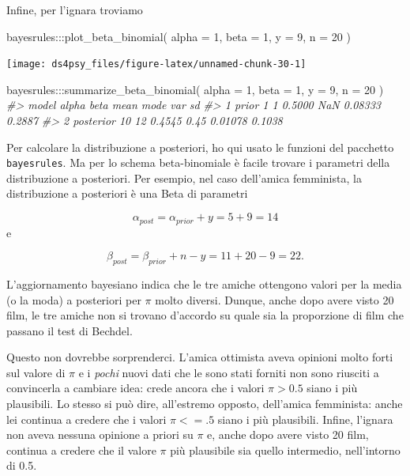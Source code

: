 \documentclass[
  11pt,
]{krantz}
\makeatletter
\newenvironment{Shaded}{\begin{snugshade}}{\end{snugshade}}
\newcommand{\AttributeTok}[1]{\textcolor[rgb]{0.61,0.61,0.61}{#1}}
\newcommand{\CommentTok}[1]{\textcolor[rgb]{0.37,0.37,0.37}{\textit{#1}}}
\newcommand{\DecValTok}[1]{\textcolor[rgb]{0.06,0.06,0.06}{#1}}
\newcommand{\FunctionTok}[1]{\textcolor[rgb]{0,0,0}{#1}}
\newcommand{\NormalTok}[1]{#1}
\newcommand{\SpecialCharTok}[1]{\textcolor[rgb]{0,0,0}{#1}}
\newenvironment{kframe}{%
\medskip{}
\setlength{\fboxsep}{.8em}
 \def\at@end@of@kframe{}%
 \ifinner\ifhmode%
  \def\at@end@of@kframe{\end{minipage}}%
  \begin{minipage}{\columnwidth}%
 \fi\fi%
 \def\FrameCommand##1{\hskip\@totalleftmargin \hskip-\fboxsep
 \colorbox{shadecolor}{##1}\hskip-\fboxsep
     \hskip-\linewidth \hskip-\@totalleftmargin \hskip\columnwidth}%
 \MakeFramed {\advance\hsize-\width
   \@totalleftmargin\z@ \linewidth\hsize
   \@setminipage}}%
 {\par\unskip\endMakeFramed%
 \at@end@of@kframe}
\renewenvironment{Shaded}{\begin{kframe}}{\end{kframe}}
\theoremstyle{definition}
\theoremstyle{definition}
\theoremstyle{definition}
\theoremstyle{definition}
\theoremstyle{remark}
\makeatother
\begin{document}
Infine, per l'ignara troviamo

\begin{Shaded}
\begin{Highlighting}[]
\NormalTok{bayesrules}\SpecialCharTok{:::}\FunctionTok{plot\_beta\_binomial}\NormalTok{(}
  \AttributeTok{alpha =} \DecValTok{1}\NormalTok{, }\AttributeTok{beta =} \DecValTok{1}\NormalTok{, }\AttributeTok{y =} \DecValTok{9}\NormalTok{, }\AttributeTok{n =} \DecValTok{20}
\NormalTok{)}
\end{Highlighting}
\end{Shaded}

\begin{center}\texttt{[image: ds4psy\_files/figure-latex/unnamed-chunk-30-1]} \end{center}

\begin{Shaded}
\begin{Highlighting}[]
\NormalTok{bayesrules}\SpecialCharTok{:::}\FunctionTok{summarize\_beta\_binomial}\NormalTok{(}
  \AttributeTok{alpha =} \DecValTok{1}\NormalTok{, }\AttributeTok{beta =} \DecValTok{1}\NormalTok{, }\AttributeTok{y =} \DecValTok{9}\NormalTok{, }\AttributeTok{n =} \DecValTok{20}
\NormalTok{)}
\CommentTok{\#\textgreater{}       model alpha beta   mean mode     var     sd}
\CommentTok{\#\textgreater{} 1     prior     1    1 0.5000  NaN 0.08333 0.2887}
\CommentTok{\#\textgreater{} 2 posterior    10   12 0.4545 0.45 0.01078 0.1038}
\end{Highlighting}
\end{Shaded}

Per calcolare la distribuzione a posteriori, ho qui usato le funzioni del pacchetto \texttt{bayesrules}. Ma per lo schema beta-binomiale è facile trovare i parametri della distribuzione a posteriori. Per esempio, nel caso dell'amica femminista, la distribuzione a posteriori è una Beta di parametri

\[
\alpha_{post} = \alpha_{prior} + y = 5+9 = 14
\] e

\[
\beta_{post} = \beta_{prior} + n - y = 11 + 20 - 9 = 22.
\]

L'aggiornamento bayesiano indica che le tre amiche ottengono valori per la media (o la moda) a posteriori per \(\pi\) molto diversi. Dunque, anche dopo avere visto 20 film, le tre amiche non si trovano d'accordo su quale sia la proporzione di film che passano il test di Bechdel.

Questo non dovrebbe sorprenderci. L'amica ottimista aveva opinioni molto forti sul valore di \(\pi\) e i \emph{pochi} nuovi dati che le sono stati forniti non sono riusciti a convincerla a cambiare idea: crede ancora che i valori \(\pi > 0.5\) siano i più plausibili. Lo stesso si può dire, all'estremo opposto, dell'amica femminista: anche lei continua a credere che i valori \(\pi < =.5\) siano i più plausibili. Infine, l'ignara non aveva nessuna opinione a priori su \(\pi\) e, anche dopo avere visto 20 film, continua a credere che il valore \(\pi\) più plausibile sia quello intermedio, nell'intorno di 0.5.
\end{document}
